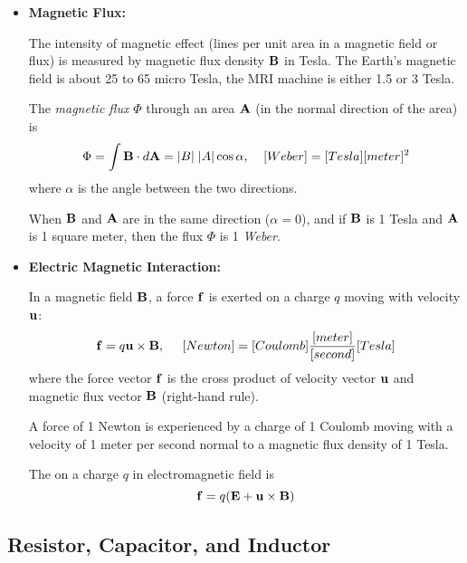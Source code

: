 \documentclass{article}
\begin{document}
\begin{itemize}
\item {\bf Magnetic Flux:} 

  The intensity of magnetic effect (lines per unit area in a magnetic
  field or flux) is measured by magnetic flux density ${\bf B}$ in Tesla. 
  The Earth's magnetic field is about 25 to 65 micro Tesla, the MRI machine 
  is either 1.5 or 3 Tesla.

  The {\em magnetic flux} $\Phi$ through an area ${\bf A}$ (in the normal
  direction of the area) is
  \begin{equation}
    \Phi=\int {\bf B} \cdot d{\bf A}=|B|\;|A| \cos\alpha,\;\;\;\;
              [Weber]=[Tesla] [meter]^2	
  \end{equation}   
  where $\alpha$ is the angle between the two directions. 
	
  When ${\bf B}$ and ${\bf A}$ are in the same direction ($\alpha=0$), 
  and if ${\bf B}$ is 1 Tesla and ${\bf A}$ is 1 square meter, then the
  flux $\Phi$ is 1 {\em Weber}.

\item {\bf Electric Magnetic Interaction:}

  In a magnetic field ${\bf B}$, a force ${\bf f}$ is exerted on a charge $q$ 
  moving with velocity ${\bf u}$:
  \begin{equation}
    {\bf f}=q{\bf u} \times {\bf B},\;\;\;\;\;
    [Newton]=[Coulomb]\frac{[meter]}{[second]} [Tesla]	
  \end{equation}
  where the force vector ${\bf f}$ is the cross product of velocity vector 
  ${\bf u}$ and magnetic flux vector ${\bf B}$ (right-hand rule).

  A force of 1 Newton is experienced by a charge of 1 Coulomb moving with a 
  velocity of 1 meter per second normal to a magnetic flux density of 1 Tesla.


  The 
  on a charge $q$ in electromagnetic field is 
  \begin{equation}
    {\bf f}=q({\bf E}+{\bf u}\times {\bf B}) 
  \end{equation}

\end{itemize}


\subsection*{Resistor, Capacitor, and Inductor}
\end{document}
